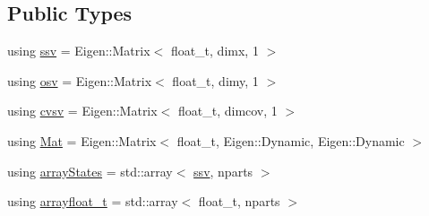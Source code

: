 \subsection*{Public Types}
\begin{DoxyCompactItemize}
\item 
using \hyperlink{classBSFilterWC_afff292a8cc15505cc3aa244135203c78}{ssv} = Eigen\+::\+Matrix$<$ float\+\_\+t, dimx, 1 $>$
\item 
using \hyperlink{classBSFilterWC_a48b0c7f1a1cf7e57300cf820e74057ce}{osv} = Eigen\+::\+Matrix$<$ float\+\_\+t, dimy, 1 $>$
\item 
using \hyperlink{classBSFilterWC_a52f5a46901a821fffe82937543220a1a}{cvsv} = Eigen\+::\+Matrix$<$ float\+\_\+t, dimcov, 1 $>$
\item 
using \hyperlink{classBSFilterWC_a507a06203a27e3a025a43be68b4b0e0e}{Mat} = Eigen\+::\+Matrix$<$ float\+\_\+t, Eigen\+::\+Dynamic, Eigen\+::\+Dynamic $>$
\item 
using \hyperlink{classBSFilterWC_af89dac8c324ae8b549595a85e89ec7da}{array\+States} = std\+::array$<$ \hyperlink{classBSFilterWC_afff292a8cc15505cc3aa244135203c78}{ssv}, nparts $>$
\item 
using \hyperlink{classBSFilterWC_a12c3f32cb628a0efaa0267262205d6d6}{arrayfloat\+\_\+t} = std\+::array$<$ float\+\_\+t, nparts $>$
\end{DoxyCompactItemize}
